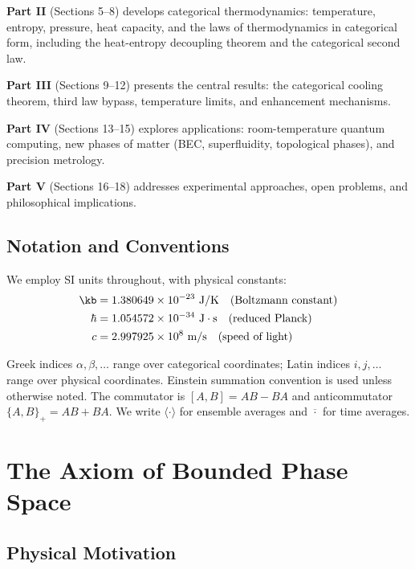 \textbf{Part II} (Sections 5--8) develops categorical thermodynamics: temperature, entropy, pressure, heat capacity, and the laws of thermodynamics in categorical form, including the heat-entropy decoupling theorem and the categorical second law.

\textbf{Part III} (Sections 9--12) presents the central results: the categorical cooling theorem, third law bypass, temperature limits, and enhancement mechanisms.

\textbf{Part IV} (Sections 13--15) explores applications: room-temperature quantum computing, new phases of matter (BEC, superfluidity, topological phases), and precision metrology.

\textbf{Part V} (Sections 16--18) addresses experimental approaches, open problems, and philosophical implications.

\subsection{Notation and Conventions}

We employ SI units throughout, with physical constants:
\begin{align}
\kb &= 1.380649 \times 10^{-23} \text{ J/K} \quad \text{(Boltzmann constant)} \nonumber \\
\hbar &= 1.054572 \times 10^{-34} \text{ J}\cdot\text{s} \quad \text{(reduced Planck)} \nonumber \\
c &= 2.997925 \times 10^{8} \text{ m/s} \quad \text{(speed of light)} \nonumber
\end{align}

Greek indices $\alpha, \beta, \ldots$ range over categorical coordinates; Latin indices $i, j, \ldots$ range over physical coordinates. Einstein summation convention is used unless otherwise noted. The commutator is $[A, B] = AB - BA$ and anticommutator $\{A, B\}_+ = AB + BA$. We write $\langle \cdot \rangle$ for ensemble averages and $\overline{\cdot}$ for time averages.

\section{The Axiom of Bounded Phase Space}

\subsection{Physical Motivation}

